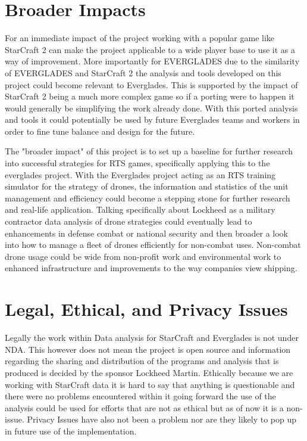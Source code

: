 \documentclass[a4paper,12pt]{report}
\begin{document}
\section{Broader Impacts}

For an immediate impact of the project working with a popular game like StarCraft 2 can make the project applicable to a wide player base to use it as a way of improvement. More importantly for EVERGLADES due to the similarity of EVERGLADES and StarCraft 2 the analysis and tools developed on this project could become relevant to Everglades. This is supported by the impact of StarCraft 2 being a much more complex game so if a porting were to happen it would generally be simplifying the work already done. With this ported analysis and tools it could potentially be used by future Everglades teams and workers in order to fine tune balance and design for the future.

The "broader impact" of this project is to set up a baseline for further research into successful strategies for RTS games, specifically applying this to the everglades project. With the Everglades project acting as an RTS training simulator for the strategy of drones, the information and statistics of the unit management and efficiency could become a stepping stone for further research and real-life application. Talking specifically about Lockheed as a military contractor data analysis of drone strategies could eventually lead to enhancements in defense combat or national security and then broader a look into how to manage a fleet of drones efficiently for non-combat uses. Non-combat drone usage could be wide from non-profit work and environmental work to enhanced infrastructure and improvements to the way companies view shipping.

\section{Legal, Ethical, and Privacy Issues}

Legally the work within Data analysis for StarCraft and Everglades is not under NDA. This however does not mean the project is open source and information regarding the sharing and distribution of the programs and analysis that is produced is decided by the sponsor Lockheed Martin. Ethically because we are working with StarCraft data it is hard to say that anything is questionable and there were no problems encountered within it going forward the use of the analysis could be used for efforts that are not as ethical but as of now it is a non-issue. Privacy Issues have also not been a problem nor are they likely to pop up in future use of the implementation.
\end{document}
